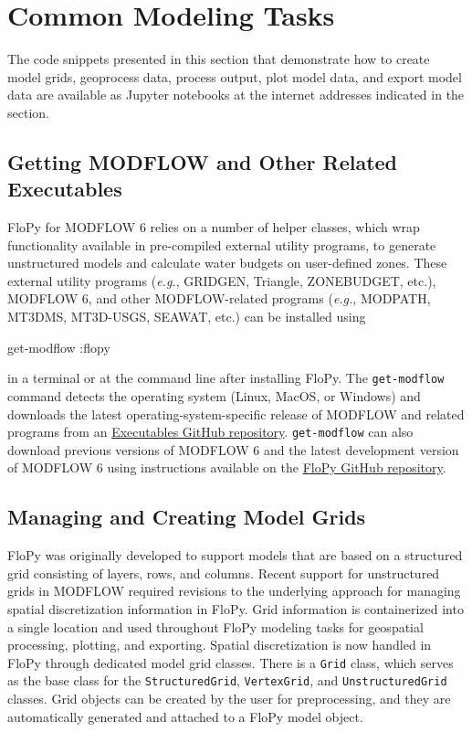\documentclass[12pt, oneside]{article}  	%
\begin{document}
\section*{Common Modeling Tasks}

The code snippets presented in this section that demonstrate how to create model grids, geoprocess data, process output, plot model data, and export model data are available as Jupyter notebooks \citep{Kluyver:2016aa} at the internet addresses indicated in the  section.

\subsection*{Getting MODFLOW and Other Related Executables}

FloPy for MODFLOW 6 relies on a number of helper classes, which wrap functionality available in pre-compiled external utility programs, to generate unstructured models and calculate water budgets on user-defined zones. These external utility programs (\textit{e.g.}, GRIDGEN, Triangle, ZONEBUDGET, etc.), MODFLOW 6, and other MODFLOW-related programs (\textit{e.g.}, MODPATH, MT3DMS, MT3D-USGS, SEAWAT, etc.) can be installed using

\begin{terminal}
get-modflow :flopy
\end{terminal}

\noindent in a terminal or at the command line after installing FloPy. The \texttt{get-modflow} command detects the operating system (Linux, MacOS, or Windows) and downloads the latest operating-system-specific release of MODFLOW and related programs from an \href{https://github.com/MODFLOW-USGS/executables}{Executables GitHub repository}. \texttt{get-modflow} can also download previous versions of MODFLOW 6 and the latest development version of MODFLOW 6 using instructions available on the \href{https://github.com/modflowpy/flopy/blob/develop/docs/get_modflow.md}{FloPy GitHub repository}.

\subsection*{Managing and Creating Model Grids}

FloPy was originally developed to support models that are based on a structured grid consisting of layers, rows, and columns. Recent support for unstructured grids in MODFLOW \citep{modflowusg, modflow6gwf} required revisions to the underlying approach for managing spatial discretization information in FloPy. Grid information is containerized into a single location and used throughout FloPy modeling tasks for geospatial processing, plotting, and exporting. Spatial discretization is now handled in FloPy through dedicated model grid classes. There is a \texttt{Grid} class, which serves as the base class for the \texttt{StructuredGrid}, \texttt{VertexGrid}, and \texttt{UnstructuredGrid} classes. Grid objects can be created by the user for preprocessing, and they are automatically generated and attached to a FloPy model object.
\end{document}
